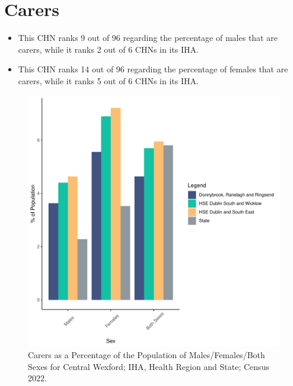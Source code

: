 \documentclass{article}
\begin{document}
\section{Carers}\label{sect:Carers}
\begin{itemize}
\item This CHN ranks  9 out of 96 regarding the percentage of males that are carers, while it ranks   2 out of 6 CHNs in its IHA.
\item This CHN ranks  14 out of 96 regarding the percentage of females that are carers, while it ranks   5 out of 6 CHNs in its IHA.
\end{itemize}
\begin{figure}[H]
	\centering
	\includegraphics[width = 150mm]{../figures/CareED.pdf}
	\caption{Carers as a Percentage of the Population of Males/Females/Both Sexes for Central Wexford; IHA, Health Region and State; Census 2022.}
	\label{fig:2ae19629-1a6a-13a3-e055-000000000001}
	\end{figure}
\end{document}
